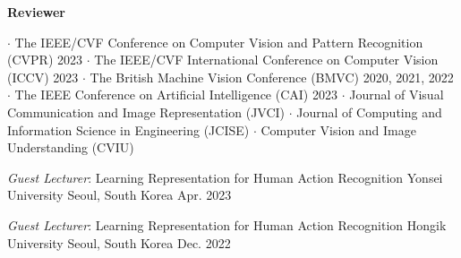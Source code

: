 


\vspace{-.5em}\textbf{Reviewer}
\begin{cvskills}
\cvskill
{} %
{\hspace{-3em} \textbf{$\cdot$} The IEEE/CVF Conference on Computer Vision and Pattern Recognition (CVPR) 2023}
\cvskill
{} %
{\hspace{-3em} \textbf{$\cdot$} The IEEE/CVF International Conference on Computer Vision (ICCV) 2023}
\cvskill
{} %
{\hspace{-3em} \textbf{$\cdot$} The British Machine Vision Conference (BMVC) 2020, 2021, 2022}
\cvskill
{} %
{\hspace{-3em} \textbf{$\cdot$} The IEEE Conference on Artificial Intelligence (CAI) 2023}
\cvskill
{} %
{\hspace{-3em} \textbf{$\cdot$} Journal of Visual Communication and Image Representation (JVCI)}
\cvskill
{}
{\hspace{-3em} \textbf{$\cdot$} Journal of Computing and Information Science in Engineering (JCISE)}
\cvskill
{}
{\hspace{-3em} \textbf{$\cdot$} Computer Vision and Image Understanding (CVIU)}


\end{cvskills}


\vspace{.5em}

\cventry
{\textit{Guest Lecturer}: Learning Representation for Human Action Recognition}
{Yonsei University}
{Seoul, South Korea}
{Apr. 2023}
{}

\vspace{-.5em}
\cventry
{\textit{Guest Lecturer}: Learning Representation for Human Action Recognition}
{Hongik University}
{Seoul, South Korea}
{Dec. 2022}
{}
\vspace{-1em}

